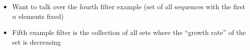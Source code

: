 \documentclass{article}
\theoremstyle{definition}
\begin{document}
\begin{itemize}
    \item Want to talk over the fourth filter example (set of all sequences with the first $n$ elements fixed)
    \item Fifth example filter is the collection of all sets where the ``growth rate'' of the set is decreasing
\end{itemize}
\end{document}
